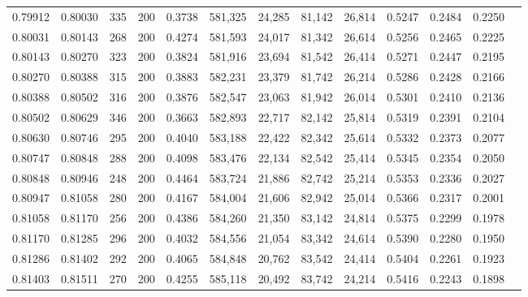 \begin{tabular}{rrrrrrrrrrrrr}
0.79912 & 0.80030 &    335 & 200 &                                     0.3738 & 581,325 &  24,285 &  81,142 &  26,814 & 0.5247 & 0.2484 & 0.2250 \\
0.80031 & 0.80143 &    268 & 200 &                                     0.4274 & 581,593 &  24,017 &  81,342 &  26,614 & 0.5256 & 0.2465 & 0.2225 \\
0.80143 & 0.80270 &    323 & 200 &                                     0.3824 & 581,916 &  23,694 &  81,542 &  26,414 & 0.5271 & 0.2447 & 0.2195 \\
0.80270 & 0.80388 &    315 & 200 &                                     0.3883 & 582,231 &  23,379 &  81,742 &  26,214 & 0.5286 & 0.2428 & 0.2166 \\
0.80388 & 0.80502 &    316 & 200 &                                     0.3876 & 582,547 &  23,063 &  81,942 &  26,014 & 0.5301 & 0.2410 & 0.2136 \\
0.80502 & 0.80629 &    346 & 200 &                                     0.3663 & 582,893 &  22,717 &  82,142 &  25,814 & 0.5319 & 0.2391 & 0.2104 \\
0.80630 & 0.80746 &    295 & 200 &                                     0.4040 & 583,188 &  22,422 &  82,342 &  25,614 & 0.5332 & 0.2373 & 0.2077 \\
0.80747 & 0.80848 &    288 & 200 &                                     0.4098 & 583,476 &  22,134 &  82,542 &  25,414 & 0.5345 & 0.2354 & 0.2050 \\
0.80848 & 0.80946 &    248 & 200 &                                     0.4464 & 583,724 &  21,886 &  82,742 &  25,214 & 0.5353 & 0.2336 & 0.2027 \\
0.80947 & 0.81058 &    280 & 200 &                                     0.4167 & 584,004 &  21,606 &  82,942 &  25,014 & 0.5366 & 0.2317 & 0.2001 \\
0.81058 & 0.81170 &    256 & 200 &                                     0.4386 & 584,260 &  21,350 &  83,142 &  24,814 & 0.5375 & 0.2299 & 0.1978 \\
0.81170 & 0.81285 &    296 & 200 &                                     0.4032 & 584,556 &  21,054 &  83,342 &  24,614 & 0.5390 & 0.2280 & 0.1950 \\
0.81286 & 0.81402 &    292 & 200 &                                     0.4065 & 584,848 &  20,762 &  83,542 &  24,414 & 0.5404 & 0.2261 & 0.1923 \\
0.81403 & 0.81511 &    270 & 200 &                                     0.4255 & 585,118 &  20,492 &  83,742 &  24,214 & 0.5416 & 0.2243 & 0.1898 \\

\end{tabular}
